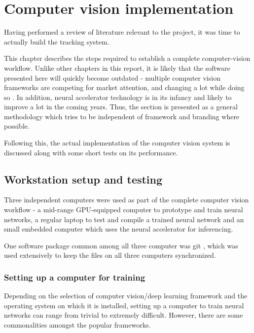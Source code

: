 \chapter{Computer vision implementation}

Having performed a review of literature relevant to the project, it was time to actually build the tracking system.

This chapter describes the steps required to establish a complete computer-vision workflow. Unlike other chapters in this report, it is likely that the software presented here will quickly become outdated - multiple computer vision frameworks are competing for market attention, and changing a lot while doing so \cite{website:comparison_deep_learning_software}. In addition, neural accelerator technology is in its infancy and likely to improve a lot in the coming years. Thus, the section is presented as a general methodology which tries to be independent of framework and branding where possible.

Following this, the actual implementation of the computer vision system is discussed along with some short tests on its performance.


\section{Workstation setup and testing}
Three independent computers were used as part of the complete computer vision workflow - a mid-range GPU-equipped computer to prototype and train neural networks, a regular laptop to test and compile a trained neural network and an small embedded computer which uses the neural accelerator for inferencing.

One software package common among all three computer was git \cite{git}, which was used extensively to keep the files on all three computers synchronized.

\subsection{Setting up a computer for training}
Depending on the selection of computer vision/deep learning framework and the operating system on which it is installed, setting up a computer to train neural networks can range from trivial to extremely difficult. However, there are some commonalities amongst the popular frameworks.

